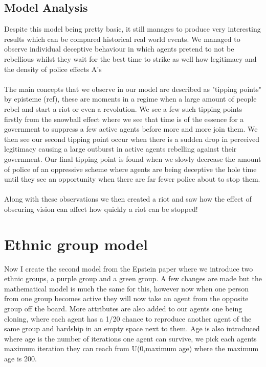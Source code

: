 \documentclass[11pt]{article}
\begin{document}
	\subsection{Model Analysis}
	Despite this model being pretty basic, it still manages to produce very interesting results which can be compared historical real world events. We managed to observe individual deceptive behaviour in which agents pretend to not be rebellious whilst they wait for the best time to strike as well how legitimacy and the density of police effects A's\\
	\\
	The main concepts that we observe in our model are described as "tipping points" by episteme (ref), these are moments in a regime when a large amount of people rebel and start a riot or even a revolution. We see a few such tipping points firstly from the snowball effect where we see that time is of the essence for a government to suppress a few active agents before more and more join them.  We then see our second tipping point occur when there is a sudden drop in perceived legitimacy causing a large outburst in active agents rebelling against their government. Our final tipping point is found when we slowly decrease the amount of police of an oppressive scheme where agents are being deceptive the hole time until they see an opportunity when there are far fewer police about to stop them.\\
	\\ 
	Along with these observations we then created a riot and saw how the effect of obscuring vision can affect how quickly a riot can be stopped!
	
	\section{Ethnic group model}
	Now I create the second model from the Epstein paper where we introduce two ethnic groups, a purple group and a green group. A few changes are made but the mathematical model is much the same for this, however now when one person from one group becomes active they will now take an agent from the opposite group off the board. More attributes are also added to our agents one being cloning, where each agent has a 1/20 chance to reproduce another agent of the same group and hardship in an empty space next to them. Age is also introduced where age is the number of iterations one agent can survive, we pick each agents maximum iteration they can reach from U(0,maximum age) where the maximum age is 200.
\end{document}
